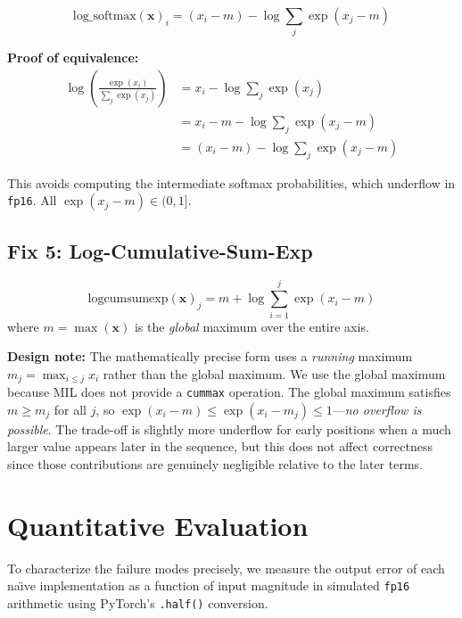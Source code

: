 \documentclass[10pt,twocolumn]{article}
\newcommand{\fp}{\texttt{fp16}}
\begin{document}
\begin{equation}
  \text{log\_softmax}(\mathbf{x})_i = (x_i - m) - \log \sum_j \exp(x_j - m)
  \label{eq:stable_logsoftmax}
\end{equation}

\textbf{Proof of equivalence:}
\begin{align*}
\log\left(\frac{\exp(x_i)}{\sum_j \exp(x_j)}\right)
&= x_i - \log \sum_j \exp(x_j) \\
&= x_i - m - \log \sum_j \exp(x_j - m) \\
&= (x_i - m) - \log \sum_j \exp(x_j - m)
\end{align*}

This avoids computing the intermediate softmax probabilities,
which underflow in \fp{}.  All $\exp(x_j - m) \in (0, 1]$.

\subsection{Fix 5: Log-Cumulative-Sum-Exp}
\label{sec:fix_logcumsumexp}

\begin{equation}
  \text{logcumsumexp}(\mathbf{x})_j =
  m + \log \sum_{i=1}^{j} \exp(x_i - m)
  \label{eq:stable_lcse}
\end{equation}
where $m = \max(\mathbf{x})$ is the \emph{global} maximum over
the entire axis.

\textbf{Design note:} The mathematically precise form uses a
\emph{running} maximum $m_j = \max_{i \leq j} x_i$ rather than
the global maximum.  We use the global maximum because MIL does
not provide a \texttt{cummax} operation.  The global maximum
satisfies $m \geq m_j$ for all $j$, so
$\exp(x_i - m) \leq \exp(x_i - m_j) \leq 1$---\emph{no overflow
is possible}.  The trade-off is slightly more underflow for early
positions when a much larger value appears later in the sequence,
but this does not affect correctness since those contributions
are genuinely negligible relative to the later terms.


\section{Quantitative Evaluation}
\label{sec:evaluation}

To characterize the failure modes precisely, we measure the output
error of each na\"{\i}ve implementation as a function of input
magnitude in simulated \fp{} arithmetic using PyTorch's
\texttt{.half()} conversion.
\end{document}
